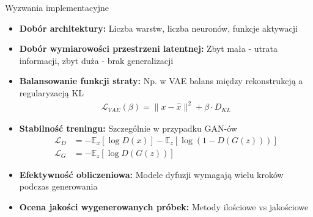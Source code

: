\documentclass{beamer}
\begin{document}
\begin{frame}{Wyzwania implementacyjne}
  \begin{itemize}
    \item \textbf{Dobór architektury:} Liczba warstw, liczba neuronów, funkcje aktywacji
    \item \textbf{Dobór wymiarowości przestrzeni latentnej:} Zbyt mała - utrata informacji, zbyt duża - brak generalizacji
    \item \textbf{Balansowanie funkcji straty:} Np. w VAE balans między rekonstrukcją a regularyzacją KL
    \begin{align*}
      \mathcal{L}_{VAE}(\beta) = \|x - \hat{x}\|^2 + \beta \cdot D_{KL}
    \end{align*}
    \item \textbf{Stabilność treningu:} Szczególnie w przypadku GAN-ów
    \begin{align*}
      \mathcal{L}_D &= -\mathbb{E}_x[\log D(x)] - \mathbb{E}_z[\log(1 - D(G(z)))] \\
      \mathcal{L}_G &= -\mathbb{E}_z[\log D(G(z))]
    \end{align*}
    \item \textbf{Efektywność obliczeniowa:} Modele dyfuzji wymagają wielu kroków podczas generowania
    \item \textbf{Ocena jakości wygenerowanych próbek:} Metody ilościowe vs jakościowe
  \end{itemize}
\end{frame}
\end{document}
